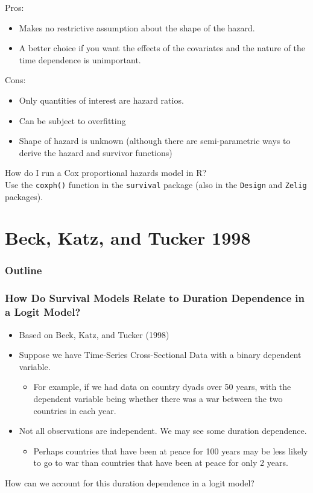 \documentclass{beamer}
\begin{document}
\begin{frame}
Pros:
\pause
\begin{itemize}
\item Makes no restrictive assumption about the shape of the hazard.
\pause
\item A better choice if you want the effects of the covariates and
the nature of the time dependence is unimportant.
\end{itemize}
\pause
Cons:
\pause
\begin{itemize}
\item Only quantities of interest are hazard ratios.
\pause
\item Can be subject to overfitting
\pause
\item Shape of hazard is unknown (although there are semi-parametric
ways to derive the hazard and survivor functions)
\end{itemize}

\end{frame}

\begin{frame}
How do I run a Cox proportional hazards model in R?\\
\pause
\bigskip
Use the {\tt coxph()} function in the {\tt survival} package (also in
the {\tt Design} and {\tt Zelig} packages).
\end{frame}

\section{Beck, Katz, and Tucker 1998}

\begin{frame}
\frametitle{Outline}
\tableofcontents[currentsection]
\end{frame}

\begin{frame}
\frametitle{How Do Survival Models Relate to Duration Dependence in a
Logit Model?}
\pause
\begin{itemize}
\item Based on Beck, Katz, and Tucker (1998)
\pause
\item Suppose we have Time-Series Cross-Sectional Data with a binary
dependent variable.
\pause
\begin{itemize}
\item For example, if we had data on country dyads over 50 years, with
the dependent variable being whether there was a war between the two
countries in each year.
\end{itemize} 
\pause
\item Not all observations are independent. We may see some duration dependence.
\pause
\begin{itemize}
\item Perhaps countries that have been at peace for 100 years may be
less likely to go to war than countries that have been at peace for
only 2 years.
\end{itemize} 
\end{itemize}
\pause
\bigskip
How can we account for this duration dependence in a logit model?
\end{frame}
\end{document}

